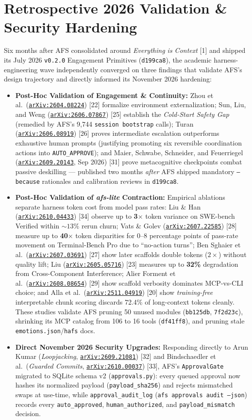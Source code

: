 \documentclass[10pt,letterpaper]{article}
\newcommand{\code}[1]{\texttt{\color{InkNavy}#1}}
\newcommand{\arxiv}[1]{\href{https://arxiv.org/abs/#1}{\code{arXiv:#1}}}
\begin{document}
\section{Retrospective 2026 Validation \& Security Hardening}

Six months after AFS consolidated around \emph{Everything is Context} [1] and shipped its July 2026 \code{v0.2.0} Engagement Primitives (\code{d199ca8}), the academic harness-engineering wave independently converged on three findings that validate AFS's design trajectory and directly informed its November 2026 hardening:

\begin{itemize}
  \item \textbf{Post-Hoc Validation of Engagement \& Continuity:} Zhou et al.\ (\arxiv{2604.08224}) [22] formalize environment externalization; Sun, Liu, and Weng (\arxiv{2606.07867}) [25] establish the \emph{Cold-Start Safety Gap} (remedied by AFS's 9,744 \code{session bootstrap} calls); Turan (\arxiv{2606.08919}) [26] proves intermediate escalation outperforms exhaustive human prompts (justifying promoting six reversible coordination actions into \code{AUTO\_APPROVE}); and Maier, Schwabe, Schneider, and Feuerriegel (\arxiv{2609.20143}, Sep 2026) [31] prove metacognitive checkpoints combat passive deskilling --- published two months \emph{after} AFS shipped mandatory \code{--because} rationales and calibration reviews in \code{d199ca8}.
  \item \textbf{Post-Hoc Validation of \emph{afs-lite} Contraction:} Empirical ablations separate harness token cost from model pass rates: Liu \& Han (\arxiv{2610.04433}) [34] observe up to \textbf{3$\times$} token variance on SWE-bench Verified within $\sim 13\%$ rerun churn; Vats \& Golev (\arxiv{2607.22585}) [28] measure up to \textbf{40$\times$} token disparities for 0--8 percentage points of pass-rate movement on Terminal-Bench Pro due to ``no-action turns''; Ben Sghaier et al.\ (\arxiv{2607.03691}) [27] show later scaffolds double tokens ($2\times$) without quality lift; Liu (\arxiv{2605.05716}) [23] measures up to \textbf{32\%} degradation from Cross-Component Interference; Alier Forment et al.\ (\arxiv{2608.08654}) [29] show scaffold verbosity dominates MCP-vs-CLI choice; and Alla et al.\ (\arxiv{2511.04919}) [20] show \emph{training-free} interpretable chunk scoring discards 72.4\% of long-context tokens cleanly. These studies validate AFS pruning 50 unused modules (\code{bb125db}, \code{7f2d23c}), shrinking its MCP catalog from 106 to 16 tools (\code{df41ff8}), and pruning stale \code{emotions.json}/\code{hafs} docs.
  \item \textbf{Direct November 2026 Security Upgrades:} Responding directly to Arun Kumar (\emph{Loopjacking}, \arxiv{2609.21081}) [32] and Bindschaedler et al.\ (\emph{Guarded Commits}, \arxiv{2610.00037}) [33], AFS's \code{ApprovalGate} migrated to SQLite schema v2 (\code{approvals.py}): every queued approval now hashes its normalized payload (\code{payload\_sha256}) and rejects mismatched swaps at use-time, while \code{approval\_audit\_log} (\code{afs approvals audit --json}) records every \code{auto\_approved}, \code{human\_authorized}, and \code{payload\_mismatch} decision.
\end{itemize}
\end{document}
